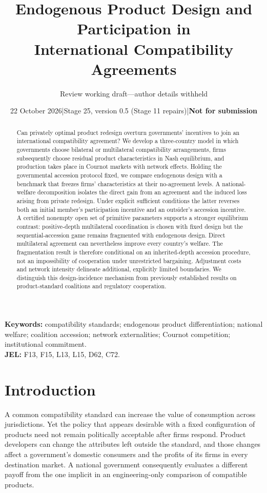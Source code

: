 \documentclass[11pt,a4paper]{article}
\title{Endogenous Product Design and Participation in\\ International Compatibility Agreements}
\author{Review working draft---author details withheld}
\date{22 October 2026\quad |\quad Stage 25, version 0.5 (Stage 11 repairs)\quad |\quad \textbf{Not for submission}}
\theoremstyle{remark}\newtheorem{remark}[theorem]{Remark}
\begin{document}
\maketitle
\begin{abstract}
Can privately optimal product redesign overturn governments' incentives to join an international compatibility agreement? We develop a three-country model in which governments choose bilateral or multilateral compatibility arrangements, firms subsequently choose residual product characteristics in Nash equilibrium, and production takes place in Cournot markets with network effects. Holding the governmental accession protocol fixed, we compare endogenous design with a benchmark that freezes firms' characteristics at their no-agreement levels. A national-welfare decomposition isolates the direct gain from an agreement and the induced loss arising from private redesign. Under explicit sufficient conditions the latter reverses both an initial member's participation incentive and an outsider's accession incentive. A certified nonempty open set of primitive parameters supports a stronger equilibrium contrast: positive-depth multilateral coordination is chosen with fixed design but the sequential-accession game remains fragmented with endogenous design. Direct multilateral agreement can nevertheless improve every country's welfare. The fragmentation result is therefore conditional on an inherited-depth accession procedure, not an impossibility of cooperation under unrestricted bargaining. Adjustment costs and network intensity delineate additional, explicitly limited boundaries. We distinguish this design-incidence mechanism from previously established results on product-standard coalitions and regulatory cooperation.
\end{abstract}
\noindent\textbf{Keywords:} compatibility standards; endogenous product differentiation; national welfare; coalition accession; network externalities; Cournot competition; institutional commitment.\\
\textbf{JEL:} F13, F15, L13, L15, D62, C72.

\section{Introduction}
A common compatibility standard can increase the value of consumption across jurisdictions. Yet the policy that appears desirable with a fixed configuration of products need not remain politically acceptable after firms respond. Product developers can change the attributes left outside the standard, and those changes affect a government's domestic consumers and the profits of its firms in every destination market. A national government consequently evaluates a different payoff from the one implicit in an engineering-only comparison of compatible products.
\end{document}
